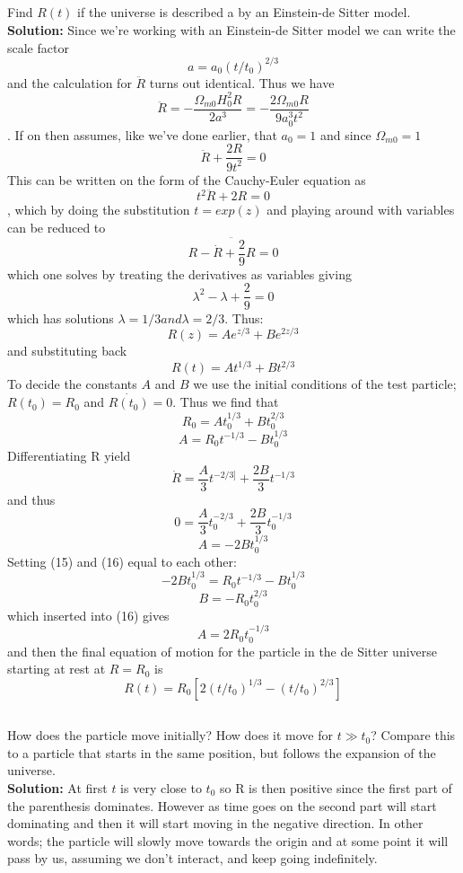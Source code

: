 \documentclass[a4paper,12pt]{article}
\begin{document}
\subsection{}
Find $R(t)$ if the universe is described a by an Einstein-de Sitter model.
\\
\textbf{Solution:}
Since we're working with an Einstein-de Sitter model we can write the scale factor 
$$ a = a_0(t/t_0)^{2/3}$$
and the calculation for $\ddot{R}$ turns out identical. Thus we have
$$\ddot{R} = -\frac{\Omega_{m0}H_0^2R}{2a^3} = -\frac{2\Omega_{m0}R}{9a_0^3t^2}$$.
If on then assumes, like we've done earlier, that $a_0 = 1$ and since $\Omega_{m0} =1$
\begin{equation}
\ddot{R} + \frac{2R}{9t^2}= 0 
\end{equation}
This can be written on the form of the Cauchy-Euler equation as
$$t^2\ddot{R} + 2R= 0 $$
, which by doing the substitution $t = exp(z)$ and playing around with variables can be reduced to 
$$\ddot{R - \dot{R} + \frac{2}{9}R = 0}$$
which one solves by treating the derivatives as variables giving
$$\lambda^2 - \lambda + \frac{2}{9} = 0$$
which has solutions $\lambda = 1/3 and \lambda=2/3$.
Thus:
$$R(z) = Ae^{z/3} + Be^{2z/3}$$
and substituting back 
\begin{equation}
R(t) = At^{1/3} + Bt^{2/3}
\end{equation}
To decide the constants $A$ and $B$ we use the initial conditions of the test particle;$R(t_0) = R_0 $ and $\dot{R(t_0)} = 0$.
Thus we find that
$$R_0 = At_0^{1/3} + Bt_0^{2/3}$$
\begin{equation}
A  = R_0t^{-1/3}-Bt_0^{1/3}
\end{equation}
Differentiating R yield
$$\dot{R}=\frac{A}{3}t^{-2/3]}+ \frac{2B}{3}t^{-1/3}$$
and thus
$$0 = \frac{A}{3}t_0^{-2/3} + \frac{2B}{3}t_0^{-1/3}$$
\begin{equation}
A = -2Bt_0^{1/3}
\end{equation}
Setting (15) and (16) equal to each other:
$$-2Bt_0^{1/3} = R_0t^{-1/3} - Bt_0^{1/3}$$
$$B = -R_0t_0^{2/3}$$
which inserted into (16) gives
$$A = 2R_0t_0^{-1/3}$$
and then the final equation of motion for the particle in the de Sitter universe starting at rest at $R = R_0$ is 
$$R(t) = R_0[2(t/t_0)^{1/3}- (t/t_0)^{2/3}]$$
\subsection{}
How does the particle move initially? How does it move for $t \gg t_0$? Compare this to a particle that starts in the same position, but follows the expansion of the universe.
\\
\textbf{Solution:}
At first $t$ is very close to $t_0$ so R is then positive since the first part of the parenthesis dominates. However as time goes on the second part will start dominating and then it will start moving in the negative direction. In other words; the particle will slowly move towards the origin and at some point it will pass by us, assuming we don't interact, and keep going indefinitely.
\end{document}
